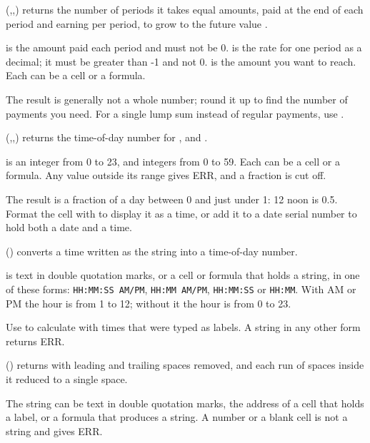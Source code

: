 (,,) returns the number of periods it takes equal  amounts, paid at the end of each period and earning  per period, to grow to the future value .

 is the amount paid each period and must not be 0.  is the rate for one period as a decimal; it must be greater than -1 and not 0.  is the amount you want to reach. Each can be a cell or a formula.

The result is generally not a whole number; round it up to find the number of payments you need. For a single lump sum instead of regular payments, use .

\Examples
{}

(,,) returns the time-of-day number for ,  and .

 is an integer from 0 to 23,  and  integers from 0 to 59. Each can be a cell or a formula. Any value outside its range gives ERR, and a fraction is cut off.

The result is a fraction of a day between 0 and just under 1: 12 noon is 0.5. Format the cell with  to display it as a time, or add it to a date serial number to hold both a date and a time.

\Examples
{}

() converts a time written as the string  into a time-of-day number.

 is text in double quotation marks, or a cell or formula that holds a string, in one of these forms: \texttt{HH:MM:SS AM/PM}, \texttt{HH:MM AM/PM}, \texttt{HH:MM:SS} or \texttt{HH:MM}. With AM or PM the hour is from 1 to 12; without it the hour is from 0 to 23.

Use  to calculate with times that were typed as labels. A string in any other form returns ERR.

\Examples
{}

() returns  with leading and trailing spaces removed, and each run of spaces inside it reduced to a single space.

The string can be text in double quotation marks, the address of a cell that holds a label, or a formula that produces a string. A number or a blank cell is not a string and gives ERR.

